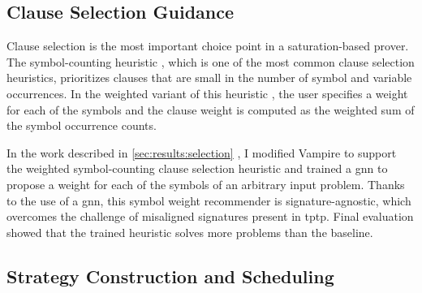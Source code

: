 \subsection{Clause Selection Guidance}
\label{sec:contrib:ClauseSelection}


Clause selection is the most important choice point in a saturation-based prover.
The symbol-counting heuristic \cite{DBLP:conf/cade/SchulzM16}, which is one of the most common clause selection heuristics,
prioritizes clauses that are small in the number of symbol and variable occurrences.
In the weighted variant of this heuristic \cite{E-manual},
the user specifies a weight for each of the symbols
and
the clause weight is computed as the weighted sum of the symbol occurrence counts.

In the work described in \cref{sec:results:selection} \cite{DBLP:conf/lpar/Bartek023},
I modified Vampire to support the weighted symbol-counting clause selection heuristic
and trained a \gls{gnn} to propose a weight for each of the symbols of an arbitrary input problem.
Thanks to the use of a \gls{gnn}, this symbol weight recommender is signature-agnostic,
which overcomes the challenge of misaligned signatures present in \gls{tptp}.
Final evaluation showed that
the trained heuristic solves  more problems than the baseline.


\subsection{Strategy Construction and Scheduling}
\label{sec:contrib:schedules}

